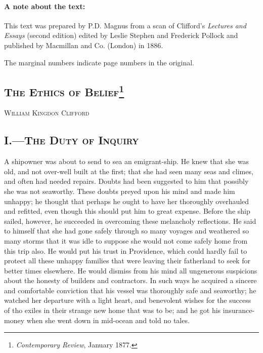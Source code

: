 \documentclass[12pt]{article}
\begin{document}
\pagestyle{fancy}
\setcounter{footnote}{0}


\paragraph{A note about the text:} This text was prepared by P.D. Magnus from a scan of Clifford's \emph{Lectures and Essays} (second edition) edited by Leslie Stephen and Frederick Pollock and published by Macmillan and Co. (London) in 1886.

The marginal numbers indicate page numbers in the original.

\begin{center}

\section*{\textsc{The Ethics of Belief}\footnote{\emph{Contemporary Review}, January 1877.}}

\textsc{William Kingdon Clifford}

\end{center}

\subsection*{I.---\textsc{The Duty of Inquiry}}

A shipowner was about to send to sea an emigrant-ship. He knew that she was old, and not over-well built at the first; that she had seen many seas and climes, and often had needed repairs. Doubts had been suggested to him that possibly she was not seaworthy. These doubts preyed upon his mind and made him unhappy; he thought that perhaps he ought to have her thoroughly overhauled and refitted, even though this should put him to great expense. Before the ship sailed, however, he succeeded in overcoming these melancholy reflections. He said to himself that she had gone safely through so many voyages and weathered so many storms that it was idle to suppose she would not come safely home from this trip also. He would put his trust in Providence, which could hardly fail to protect all these unhappy families that were leaving their fatherland to seek for better times elsewhere. He would dismiss from his mind all ungenerous suspicions about the honesty of builders and contractors. In such ways he acquired a sincere and comfortable conviction that his vessel was thoroughly safe and seaworthy; he watched her departure with a light heart, and benevolent wishes for the success of tho exiles in their strange new home that was to be; and he got his insurance-money when she went down in mid-ocean and told no tales.
\end{document}
